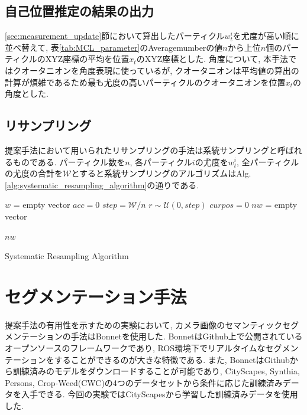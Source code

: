 \subsection{自己位置推定の結果の出力}\label{sec:estimate_current_pose}
\ref{sec:measurement_update}節において算出したパーティクル$w^{i}_{t}$を尤度が高い順に並べ替えて, 表\ref{tab:MCL_parameter}のAveragemumberの値$n$から上位$n$個のパーティクルのXYZ座標の平均を位置$x_{t}$のXYZ座標とした. 角度について, 本手法ではクオータニオンを角度表現に使っているが, クオータニオンは平均値の算出の計算が煩雑であるため\cite{Quaternion_average}最も尤度の高いパーティクルのクオータニオンを位置$x_{t}$の角度とした.

\subsection{リサンプリング}\label{sec:resampling}
 提案手法において用いられたリサンプリングの手法は系統サンプリング\cite{systematic_resampling_review}\cite{madow1944}と呼ばれるものである. パーティクル数を$n$, 各パーティクル$i$の尤度を$w_{t}^{i}$, 全パーティクルの尤度の合計を$\mathcal{W}$とすると系統サンプリングのアルゴリズムはAlg. \ref{alg:systematic_resampling_algorithm}の通りである.

\begin{algorithm}[htpb]
$w$ = empty vector\;
$acc = 0$\;
$step=\mathcal{W}/n$\;
$r \sim \mathcal{U}(0,step)$\;
$curpos=0$\;
$nw$ = empty vector\;

\Return $nw$\;

 \caption{Systematic Resampling Algorithm}
 \label{alg:systematic_resampling_algorithm}
\end{algorithm}

\section{セグメンテーション手法}
提案手法の有用性を示すための実験において, カメラ画像のセマンティックセグメンテーションの手法はBonnet\cite{milioto2019icra}を使用した. BonnetはGithub上で公開されているオープンソースのフレームワークであり, ROS環境下でリアルタイムなセグメンテーションをすることができるのが大きな特徴である. また, BonnetはGithub\cite{Bonnet_Github}から訓練済みのモデルをダウンロードすることが可能であり, CityScapes, Synthia\cite{RosCVPR16}, Persons\cite{Persons_Link}, Crop-Weed(CWC)\cite{chebrolu2017ijrr}の4つのデータセットから条件に応じた訓練済みデータを入手できる. 今回の実験ではCityScapesから学習した訓練済みデータを使用した.

